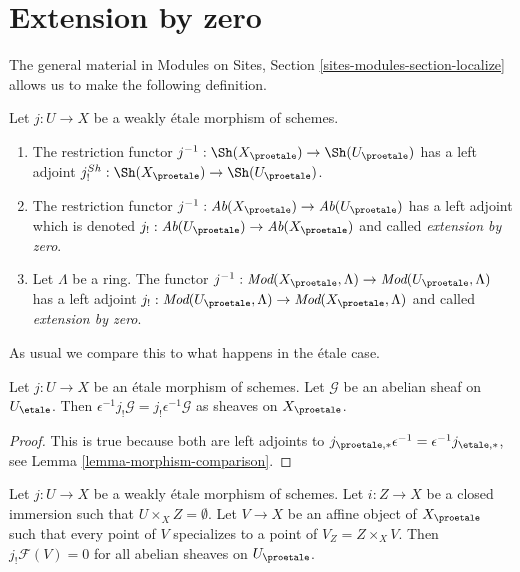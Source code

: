\section{Extension by zero}
\label{section-extension-by-zero}

\noindent
The general material in
Modules on Sites, Section \ref{sites-modules-section-localize}
allows us to make the following definition.

\begin{definition}
\label{definition-extension-zero}
Let $j : U \to X$ be a weakly \'etale morphism of schemes.
\begin{enumerate}
\item The restriction functor
$j^{-1} : \Sh(X_\proetale) \to \Sh(U_\proetale)$
has a left adjoint
$j_!^{Sh} : \Sh(X_\proetale) \to \Sh(U_\proetale)$.
\item The restriction functor
$j^{-1} : \textit{Ab}(X_\proetale) \to \textit{Ab}(U_\proetale)$
has a left adjoint which is denoted
$j_! : \textit{Ab}(U_\proetale) \to \textit{Ab}(X_\proetale)$
and called {\it extension by zero}.
\item Let $\Lambda$ be a ring. The functor
$j^{-1} : \textit{Mod}(X_\proetale, \Lambda) \to
\textit{Mod}(U_\proetale, \Lambda)$
has a left adjoint
$j_! : \textit{Mod}(U_\proetale, \Lambda) \to
\textit{Mod}(X_\proetale, \Lambda)$
and called {\it extension by zero}.
\end{enumerate}
\end{definition}

\noindent
As usual we compare this to what happens in the \'etale case.

\begin{lemma}
\label{lemma-jshriek-comparison}
Let $j : U \to X$ be an \'etale morphism of schemes.
Let $\mathcal{G}$ be an abelian sheaf on $U_\etale$.
Then $\epsilon^{-1} j_!\mathcal{G} = j_!\epsilon^{-1}\mathcal{G}$
as sheaves on $X_\proetale$.
\end{lemma}

\begin{proof}
This is true because both are left adjoints to
$j_{\proetale, *}\epsilon^{-1} = \epsilon^{-1}j_{\etale, *}$, see
Lemma \ref{lemma-morphism-comparison}.
\end{proof}

\begin{lemma}
\label{lemma-jshriek-zero}
Let $j : U \to X$ be a weakly \'etale morphism of schemes.
Let $i : Z \to X$ be a closed immersion such that $U \times_X Z = \emptyset$.
Let $V \to X$ be an affine object of $X_\proetale$ such that every point
of $V$ specializes to a point of $V_Z = Z \times_X V$.
Then $j_!\mathcal{F}(V) = 0$ for all abelian sheaves on $U_\proetale$.
\end{lemma}

